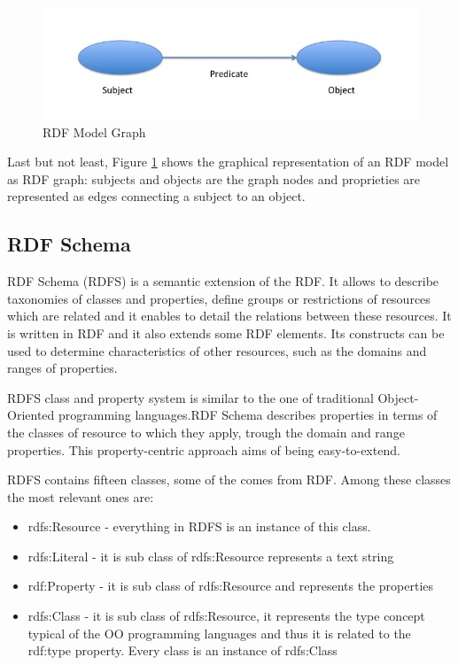 \begin{figure}[tbh]
  \centering
	\includegraphics[width=0.75\linewidth]{images/rdf-graph}
	\caption{RDF Model Graph} 
  	\label{fig:rdf-graph}
\end{figure}

Last but not least, Figure \ref{fig:rdf-graph} shows the graphical representation of an RDF model as RDF graph:  subjects and objects are the graph nodes and proprieties are represented as edges connecting a subject to an object. 

\subsection{RDF Schema}\label{sec:rdfs}

RDF Schema (RDFS) is a semantic extension of the RDF. It allows to describe taxonomies of classes and properties, define groups or  restrictions of resources which are related and  it enables to detail the relations between these resources. It is written in RDF and it also extends some RDF elements. Its constructs can be used to determine characteristics of other resources, such as the domains and ranges of properties.

RDFS class and property system is similar to the one of traditional Object-Oriented programming languages.RDF Schema describes properties in terms of the classes of resource to which they apply, trough the domain and range properties. This property-centric approach aims of being easy-to-extend.

RDFS contains fifteen classes, some of the comes from RDF. Among these classes the most relevant ones are:

\begin{itemize}
\item rdfs:Resource - everything in RDFS is an instance of this class.
\item rdfs:Literal  -  it is sub class of rdfs:Resource represents a text string
\item rdf:Property  -  it is sub class of rdfs:Resource and represents the properties
\item rdfs:Class    -   it is sub class of rdfs:Resource, it represents the type concept typical of the OO programming languages and thus it is related to the rdf:type property. Every class is an instance of rdfs:Class
\end{itemize}

